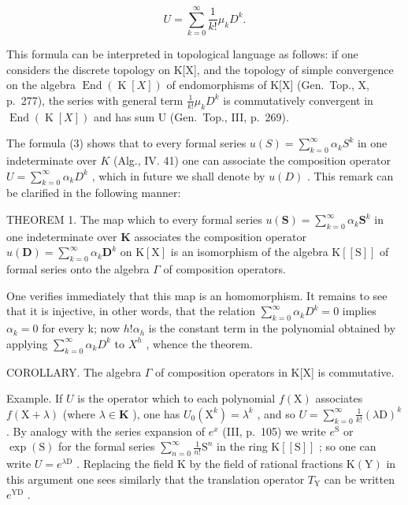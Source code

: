 \[
U = \sum_ {k = 0} ^ {\infty} \frac {1}{k !} \mu_ {k} D ^ {k}.\tag{3}
\]

This formula can be interpreted in topological language as follows: if one considers the discrete topology on K{[}X{]}, and the topology of simple convergence on the algebra \(\operatorname{End}(\operatorname{K}[X])\) of endomorphisms of K{[}X{]} (Gen.~Top., X, p.~277), the series with general term \(\frac{1}{k!}\mu_{k}D^{k}\) is commutatively convergent in \(\operatorname{End}(\operatorname{K}[X])\) and has sum U (Gen.~Top., III, p.~269).

The formula (3) shows that to every formal series \(u(S) = \sum_{k=0}^{\infty} \alpha_k S^k\) in one indeterminate over \(K\) (Alg., IV. 41) one can associate the composition operator \(U = \sum_{k=0}^{\infty} \alpha_k D^k\) , which in future we shall denote by \(u(D)\) . This remark can be clarified in the following manner:

THEOREM 1. The map which to every formal series \(u(\mathbf{S}) = \sum_{k=0}^{\infty} \alpha_k \mathbf{S}^k\) in one indeterminate over \(\mathbf{K}\) associates the composition operator \(u(\mathbf{D}) = \sum_{k=0}^{\infty} \alpha_k \mathbf{D}^k\) on \(\mathrm{K}[\mathrm{X}]\) is an isomorphism of the algebra \(\mathrm{K}[[\mathrm{S}]]\) of formal series onto the algebra \(\Gamma\) of composition operators.

One verifies immediately that this map is an homomorphism. It remains to see that it is injective, in other words, that the relation \(\sum_{k=0}^{\infty}\alpha_{k}D^{k}=0\) implies \(\alpha_{k}=0\) for every k; now \(h!\alpha_{h}\) is the constant term in the polynomial obtained by applying \(\sum_{k=0}^{\infty}\alpha_{k}D^{k}\) to \(X^{h}\) , whence the theorem.

COROLLARY. The algebra \(\Gamma\) of composition operators in K{[}X{]} is commutative.

Example. If \(U\) is the operator which to each polynomial \(f(\mathrm{X})\) associates \(f(\mathrm{X} + \lambda)\) (where \(\lambda \in \mathbf{K}\) ), one has \(U_0(\mathrm{X}^k) = \lambda^k\) , and so \(U = \sum_{k=0}^{\infty} \frac{1}{k!} (\lambda \mathrm{D})^k\) . By analogy with the series expansion of \(e^x\) (III, p.~105) we write \(e^{\mathrm{S}}\) or \(\exp(\mathrm{S})\) for the formal series \(\sum_{n=0}^{\infty} \frac{1}{n!} \mathrm{S}^n\) in the ring \(\mathrm{K}[[\mathrm{S}]]\) ; so one can write \(U = e^{\lambda \mathrm{D}}\) . Replacing the field \(\mathrm{K}\) by the field of rational fractions \(\mathrm{K}(\mathrm{Y})\) in this argument one sees similarly that the translation operator \(T_{\mathrm{Y}}\) can be written \(e^{\mathrm{YD}}\) .


